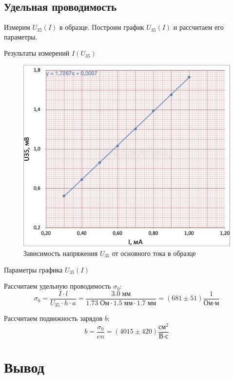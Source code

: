 \documentclass[12pt,a4paper]{article}
\begin{document}
	\subsection*{Удельная проводимость}
	
	Измерим $U_{35} (I)$ в образце. Построим график $U_{35} (I)$ и рассчитаем его параметры.
	
	\begin{table}[h]
		\caption{Результаты измерений $I(U_{35})$}
		
	\end{table}
	
	\begin{figure}[H]
		\includegraphics[width = 10 cm]{src/cond_UI.png}
		\caption{Зависимость напряжения $U_{35}$ от основного тока в образце}
	\end{figure}
	
	\begin{table}[h]
		\caption{Параметры графика $U_{35} (I)$}
		
	\end{table}
	
	Рассчитаем удельную проводимость $\sigma_0$:
	$$ \sigma_0 = \frac{I \cdot l}{U_{35} \cdot h \cdot a} = \frac{ 3.0 \; \text{мм} }{ 1.73 \; \text{Ом} \cdot 1.5 \; \text{мм} \cdot 1.7 \; \text{мм}} = (681 \pm 51) \frac{1}{\text{Ом} \cdot \text{м}} $$
	
	Рассчитаем подвижность зарядов $b$:
	$$ b = \frac{\sigma_0}{e n} = (4015 \pm 420) \frac{\text{см}^2}{\text{В} \cdot \text{с}} $$


\section*{Вывод}
\end{document}

